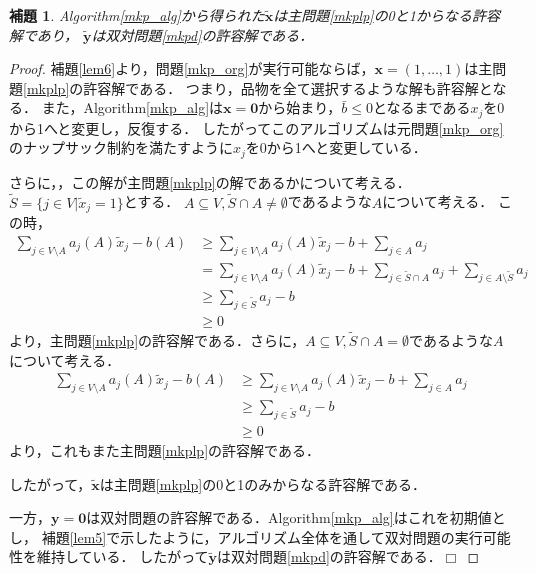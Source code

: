 \documentclass[11pt,dvipdfmx]{jarticle}
\def\qed{\hfill $\Box$}
\numberwithin{equation}{section}
\newtheorem{lem}{補題}[section]
\newtheorem{proof}{証明}
\begin{document}
            \begin{lem}
                \rm Algorithm\ref{mkp_alg}から得られた$\tilde{\bm{x}}$は主問題\eqref{mkplp}の0と1からなる許容解であり，
                $\tilde{\bm{y}}$は双対問題\eqref{mkpd}の許容解である．
            \end{lem}
            \begin{proof}
                補題\rm\ref{lem6}より，問題\eqref{mkp_org}が実行可能ならば，$\bm{x}=(1,\dotsc,1)$は主問題\eqref{mkplp}の許容解である．
                つまり，品物を全て選択するような解も許容解となる．
                また，Algorithm\ref{mkp_alg}は$\bm{x}=\bm{0}$から始まり，$\bar{b}\le0$となるまである$x_j$を0から1へと変更し，反復する．
                したがってこのアルゴリズムは元問題\eqref{mkp_org}のナップサック制約を満たすように$x_j$を0から1へと変更している．\par
                さらに，，この解が主問題\eqref{mkplp}の解であるかについて考える．
                $\tilde{S}=\{j\in V| \tilde{x}_j =1\}$とする．
                $A\subseteq V, \tilde{S}\cap A \neq \emptyset$であるような$A$について考える．
                この時，
                \begin{align}
                    \sum_{j\in V\setminus A}{a_j(A)\tilde{x}_j} - b(A) &\ge \sum_{j\in V\setminus A}{a_j(A)\tilde{x}_j} -b + \sum_{j\in A}{a_j}\\
                    &= \sum_{j\in V\setminus A}{a_j(A)\tilde{x}_j} -b +\sum_{j\in \tilde{S}\cap A}{a_j} + \sum_{j\in A\setminus \tilde{S}}{a_j}\\
                    &\ge \sum_{j\in \tilde{S}}{a_j} -b\\
                    &\ge 0
                \end{align}
                より，主問題\eqref{mkplp}の許容解である．さらに，$A\subseteq V, \tilde{S}\cap A = \emptyset$であるような$A$について考える．
                \begin{align}
                    \sum_{j\in V\setminus A}{a_j(A)\tilde{x}_j} - b(A) &\ge \sum_{j\in V\setminus A}{a_j(A)\tilde{x}_j} -b + \sum_{j\in A}{a_j}\\
                    &\ge \sum_{j\in\tilde{S}}{a_j} -b\\
                    &\ge 0
                \end{align}
                より，これもまた主問題\eqref{mkplp}の許容解である．\par
                したがって，$\tilde{\bm{x}}$は主問題\eqref{mkplp}の0と1のみからなる許容解である．\par
                一方，$\bm{y}=\bm{0}$は双対問題の許容解である．Algorithm\ref{mkp_alg}はこれを初期値とし，
                補題\ref{lem5}で示したように，アルゴリズム全体を通して双対問題の実行可能性を維持している．
                したがって$\tilde{\bm{y}}$は双対問題\eqref{mkpd}の許容解である．\qed
            \end{proof}
\end{document}
